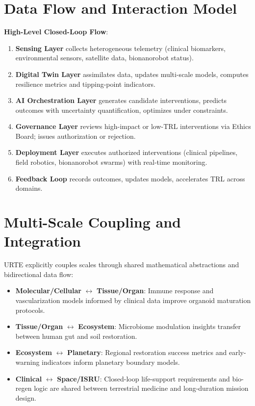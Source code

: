 \documentclass[11pt,a4paper]{report}
\begin{document}
\chapter{Data Flow and Interaction Model}

\textbf{High-Level Closed-Loop Flow}:

\begin{enumerate}
    \item \textbf{Sensing Layer} collects heterogeneous telemetry (clinical biomarkers, environmental sensors, satellite data, bionanorobot status).
    \item \textbf{Digital Twin Layer} assimilates data, updates multi-scale models, computes resilience metrics and tipping-point indicators.
    \item \textbf{AI Orchestration Layer} generates candidate interventions, predicts outcomes with uncertainty quantification, optimizes under constraints.
    \item \textbf{Governance Layer} reviews high-impact or low-TRL interventions via Ethics Board; issues authorization or rejection.
    \item \textbf{Deployment Layer} executes authorized interventions (clinical pipelines, field robotics, bionanorobot swarms) with real-time monitoring.
    \item \textbf{Feedback Loop} records outcomes, updates models, accelerates TRL across domains.
\end{enumerate}

\chapter{Multi-Scale Coupling and Integration}

URTE explicitly couples scales through shared mathematical abstractions and bidirectional data flow:

\begin{itemize}
    \item \textbf{Molecular/Cellular} $\leftrightarrow$ \textbf{Tissue/Organ}: Immune response and vascularization models informed by clinical data improve organoid maturation protocols.
    \item \textbf{Tissue/Organ} $\leftrightarrow$ \textbf{Ecosystem}: Microbiome modulation insights transfer between human gut and soil restoration.
    \item \textbf{Ecosystem} $\leftrightarrow$ \textbf{Planetary}: Regional restoration success metrics and early-warning indicators inform planetary boundary models.
    \item \textbf{Clinical} $\leftrightarrow$ \textbf{Space/ISRU}: Closed-loop life-support requirements and bio-regen logic are shared between terrestrial medicine and long-duration mission design.
\end{itemize}
\end{document}

